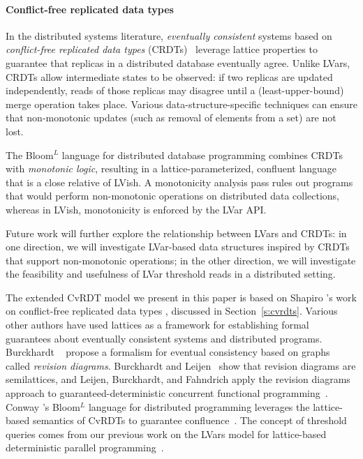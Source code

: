 
\paragraph{Conflict-free replicated data types}

In the distributed systems literature, \emph{eventually consistent}
systems based on \emph{conflict-free replicated data types}
(CRDTs)~\cite{crdts} leverage lattice properties to guarantee that
replicas in a distributed database eventually agree.  Unlike LVars,
CRDTs allow intermediate states to be observed: if two replicas are
updated independently, reads of those replicas may disagree until a
(least-upper-bound) merge operation takes place.  Various
data-structure-specific techniques can ensure that non-monotonic
updates (such as removal of elements from a set) are not lost.

The Bloom$^L$ language for distributed database programming
\cite{blooml} combines CRDTs with \emph{monotonic logic}, resulting in a
lattice-parameterized, confluent language that is a close relative of
LVish.  A monotonicity analysis pass rules out programs
that would perform non-monotonic operations on distributed data
collections, whereas in LVish, monotonicity is enforced by the LVar
API.

Future work will further explore the relationship between LVars and
CRDTs: in one direction, we will investigate LVar-based data
structures inspired by CRDTs that support non-monotonic operations; in
the other direction, we will investigate the feasibility and
usefulness of LVar threshold reads in a distributed setting.


The extended CvRDT model we present in this paper is based on Shapiro
\etal's work on conflict-free replicated data types
\cite{crdts,crdts-tr}, discussed in Section~\ref{s:cvrdts}.  Various
other authors
\cite{eventually-consistent-transactions,semantics-concurrent-revisions,blooml}
have used lattices as a framework for establishing formal guarantees
about eventually consistent systems and distributed programs.
Burckhardt \etal~\cite{eventually-consistent-transactions} propose a
formalism for eventual consistency based on graphs called
\emph{revision diagrams}.  Burckhardt and
Leijen~\cite{semantics-concurrent-revisions} show that revision
diagrams are semilattices, and Leijen, Burckhardt, and Fahndrich apply
the revision diagrams approach to guaranteed-deterministic concurrent
functional programming~\cite{concurrent-revisions-haskell11}. Conway
\etal's Bloom$^L$ language for distributed programming leverages the
lattice-based semantics of CvRDTs to guarantee
confluence~\cite{blooml}.  The concept of threshold queries 
comes from our previous work on the LVars model for
lattice-based deterministic parallel
programming~\cite{LVars-paper,Freeze-paper,effectzoo}.

